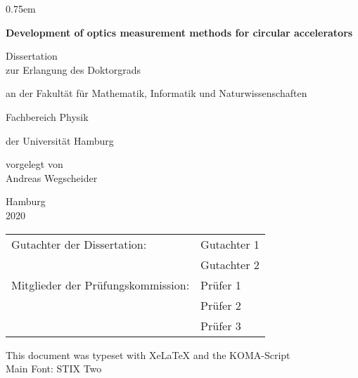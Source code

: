 \thispagestyle{empty}
\vspace{5cm}
\parskip0.75em
\begin{center}
    \Huge\bfseries
    Development of optics measurement methods for circular accelerators

    \vspace{3cm}
    \mdseries\Large
    Dissertation\\
    \vspace{1em}
    zur Erlangung des Doktorgrads

    an der Fakult\"at f\"ur Mathematik, Informatik und Naturwissenschaften
    
    Fachbereich Physik
    
    \vspace{1em}
    der Universit\"at Hamburg

    \vspace{2cm}
    \vfill
    vorgelegt von\\
    Andreas Wegscheider
    \vspace{2em}

    Hamburg\\
    2020
\end{center}
\cleardoublepage
{}

\thispagestyle{empty}
\renewcommand\baselinestretch{1.75}\selectfont
\begin{tabular}{ll}
   Gutachter der Dissertation: & Gutachter 1\\
    & Gutachter 2\\
   Mitglieder der Prüfungskommission: & Prüfer 1\\
   & Prüfer 2\\
   & Prüfer 3
\end{tabular}
\vfill
\renewcommand\baselinestretch{\textlinespread}\selectfont
\noindent This document was typeset with XeLaTeX and the KOMA-Script\\
Main Font: STIX Two

\tableofcontents
\cleardoublepage
